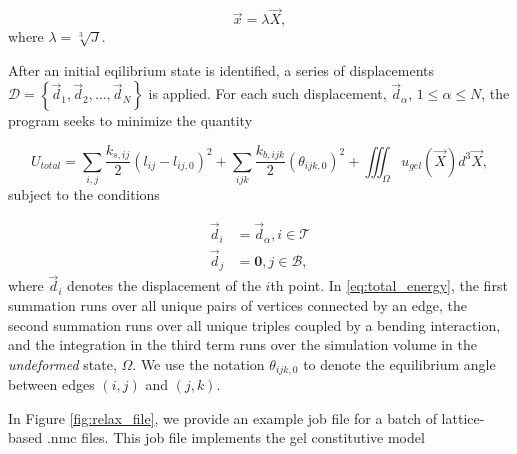 \documentclass{article}
\begin{document}
\begin{equation}
\vec{x} = \lambda \vec{X},
\end{equation}
where $\lambda = \sqrt[3]{J}$.

After an initial eqilibrium state is identified, a series of displacements
\\\mbox{$\mathcal{D} = \left\{\vec{d}_1, \vec{d}_2, \ldots, \vec{d}_N \right\}$}
is applied. For each such displacement, $\vec{d}_{\alpha}$, 
$1 \leq \alpha \leq N$, the program seeks to minimize the quantity

\begin{equation}
\label{eq:total_energy}
U_{total} = \sum_{i,j} \frac{k_{s, ij}}{2} \left(l_{ij} - l_{ij,0}\right)^2 +
\sum_{ijk} \frac{k_{b, ijk}}{2} \left(\theta_{ijk, 0}\right)^2 + \iiint_{\Omega} u_{gel}\left(\vec{X}\right) d^3 \vec{X},
\end{equation}
subject to the conditions

\begin{align}
\vec{d}_i &= \vec{d}_{\alpha}, i \in \mathcal{T}\\
\vec{d}_j &= \mathbf{0}, j \in \mathcal{B},
\end{align}
where $\vec{d}_i$ denotes the displacement of the $i$th point.
In \eqref{eq:total_energy}, the first summation runs over all unique pairs of
vertices connected by an edge, the second summation runs over all unique
triples coupled by a bending interaction, and the integration in the third
term runs over the simulation volume in the \emph{undeformed} state, $\Omega$.
We use the notation $\theta_{ijk, 0}$ to denote the equilibrium angle between
edges $(i, j)$ and $(j, k)$.

In Figure \ref{fig:relax_file}, we provide an example job file for a batch of
lattice-based .nmc files. This job file implements the gel constitutive model
\end{document}
